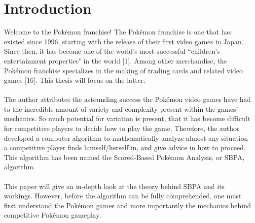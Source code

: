 \documentclass{article}
\begin{document}
\section{Introduction}
Welcome to the Pok\'emon franchise! The Pok\'emon franchise is one that has existed since 1996, starting with the release of their first video games in Japan. Since then, it has become one of the world's most successful ``children's entertainment properties" in the world [1]. Among other merchandise, the Pok\'emon franchise specializes in the making of trading cards and related video games [16]. This thesis will focus on the latter.\\\\
The author attributes the astounding success the Pok\'emon video games have had to the incredible amount of variety and complexity present within the games' mechanics. So much potential for variation is present, that it has become difficult for competitive players to decide how to play the game. Therefore, the author developed a computer algorithm to mathematically analyze almost any situation a competitive player finds himself/herself in, and give advice in how to proceed. This algorithm has been named the Scored-Based Pok\'emon Analysis, or SBPA, algorithm.\\\\
This paper will give an in-depth look at the theory behind SBPA and its workings. However, before the algorithm can be fully comprehended, one must first understand the Pok\'emon games and more importantly the mechanics behind competitive Pok\'emon gameplay.
\end{document}
